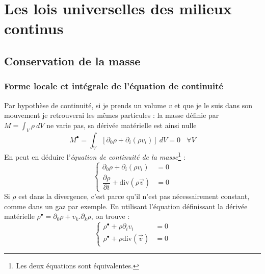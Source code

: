 \chapter{Les lois universelles des milieux continus}
\section{Conservation de la masse}
\subsection{Forme locale et intégrale de l'équation de continuité}
Par hypothèse de continuité, si je prends un volume $v$ et que je le suis dans son
mouvement je retrouverai les mêmes particules : la masse définie par $M = \int_V \rho\ 
dV$ ne varie pas, sa dérivée matérielle est ainsi nulle 
\begin{equation}
M^\bullet = \int_V [\partial_0\rho + \partial_i(\rho v_i)]\ dV = 0\ \ \ \ \forall V
\end{equation}
En peut en déduire l'\textit{équation de continuité de la masse}\footnote{Les deux
équations sont équivalentes.} :
\begin{equation}
\left\{\begin{array}{ll}
\partial_0\rho + \partial_i(\rho v_i) &=0  \\
\dfrac{\partial\rho}{\partial t} + \text{div}(\rho \vec v) &= 0 
\end{array}\right.
\end{equation}
Si $\rho$ est dans la divergence, c'est parce qu'il n'est pas nécessairement constant, 
comme dans un gaz par exemple. En utilisant l'équation définissant la dérivée matérielle
$\rho^\bullet = \partial_0\rho+ v_k.\partial_k\rho$, on trouve :
\begin{equation}
\left\{\begin{array}{ll}
\rho^\bullet +\rho\partial_i v_i &= 0   \\
\rho^\bullet +\rho\text{div}(\vec v) &=0 
\end{array}\right.
\end{equation}

